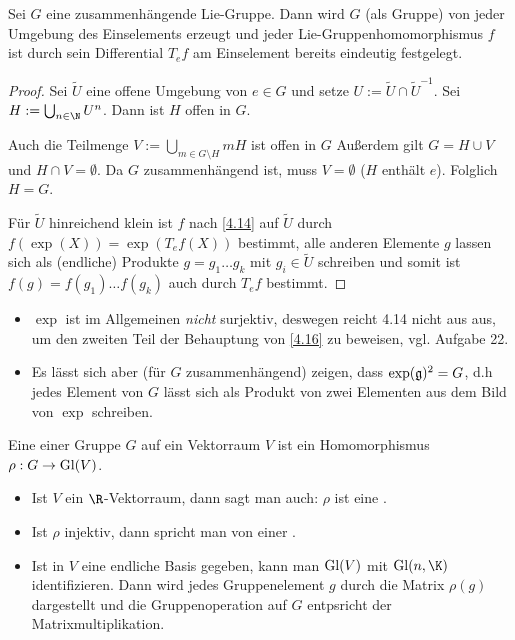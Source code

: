 \begin{st} \label{4.16}
    Sei $G$ eine zusammenhängende Lie-Gruppe.
    Dann wird $G$ (als Gruppe) von jeder Umgebung des Einselements erzeugt und jeder Lie-Gruppenhomomorphismus $f$ ist durch sein Differential $T_e f$ am Einselement bereits eindeutig festgelegt.
    \begin{proof}
        Sei $\tilde U$ eine offene Umgebung von $e \in G$ und setze $U:= \tilde U \cap {\tilde U}^{-1}$.
        Sei $H := \bigcup_{n \in \N} U^n$.
        Dann ist $H$ offen in $G$.

        Auch die Teilmenge $V := \bigcup_{m \in G \setminus H} mH$ ist offen in $G$
        Außerdem gilt $G = H \cup V$ und $H \cap V = \emptyset$.
        Da $G$ zusammenhängend ist, muss $V = \emptyset$ ($H$ enthält $e$).
        Folglich $H = G$.

        Für $\tilde U$ hinreichend klein ist $f$ nach \ref{4.14} auf $\tilde U$ durch $f(\exp(X)) = \exp(T_e f(X))$ bestimmt, alle anderen Elemente $g$ lassen sich als (endliche) Produkte $g = g_1 \dotsc g_k$ mit $g_i \in \tilde U$ schreiben und somit ist $f(g) = f(g_1) \dotsc f(g_k)$ auch durch $T_e f$ bestimmt.
    \end{proof}
\end{st}

\begin{note}
    \begin{itemize}
        \item
            $\exp$ ist im Allgemeinen \emph{nicht} surjektiv, deswegen reicht 4.14 nicht aus aus, um den zweiten Teil der Behauptung von \ref{4.16} zu beweisen, vgl. Aufgabe 22.
        \item
            Es lässt sich aber (für $G$ zusammenhängend) zeigen, dass $\exp(\mathfrak{g})^2 = G$, d.h jedes Element von $G$ lässt sich als Produkt von zwei Elementen aus dem Bild von $\exp$ schreiben.
    \end{itemize}
\end{note}




\begin{df} \label{4.17}
    Eine  einer Gruppe $G$ auf ein Vektorraum $V$ ist ein Homomorphismus $\rho: G \to \operatorname{Gl}(V)$.
    \begin{note}
        \begin{itemize}
            \item
                Ist $V$ ein $\R$-Vektorraum, dann sagt man auch: $\rho$ ist eine .
            \item
                Ist $\rho$ injektiv, dann spricht man von einer .
            \item
                Ist in $V$ eine endliche Basis gegeben, kann man $\operatorname{Gl}(V)$ mit $\Gl(n, \K)$ identifizieren.
                Dann wird jedes Gruppenelement $g$ durch die Matrix $\rho(g)$ dargestellt und die Gruppenoperation auf $G$ entpsricht der Matrixmultiplikation.
        \end{itemize}
    \end{note}
\end{df}

